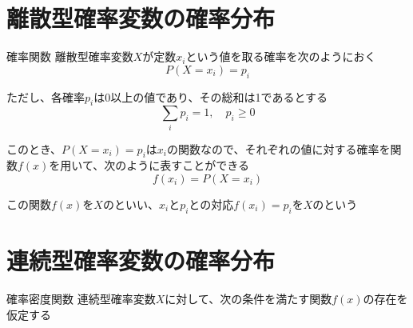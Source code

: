 \documentclass[../../../topic_probability-statistics]{subfiles}
\begin{document}
\sectionline
\section{離散型確率変数の確率分布}

\begin{definition}{確率関数}
  離散型確率変数$X$が定数$x_i$という値を取る確率を次のようにおく
  \begin{equation*}
    P(X = x_i) = p_i
  \end{equation*}

  ただし、各確率$p_i$は0以上の値であり、その総和は1であるとする
  \begin{equation*}
    \sum_{i} p_i = 1, \quad p_i \geq 0
  \end{equation*}

  このとき、$P(X=x_i) = p_i$は$x_i$の関数なので、それぞれの値に対する確率を関数$f(x)$を用いて、次のように表すことができる
  \begin{equation*}
    f(x_i) = P(X = x_i)
  \end{equation*}

  この関数$f(x)$を$X$のといい、$x_i$と$p_i$との対応$f(x_i) = p_i$を$X$のという
\end{definition}

\sectionline
\section{連続型確率変数の確率分布}

\begin{definition}{確率密度関数}
  連続型確率変数$X$に対して、次の条件を満たす関数$f(x)$の存在を仮定する

  \todo{}
\end{definition}
\end{document}
